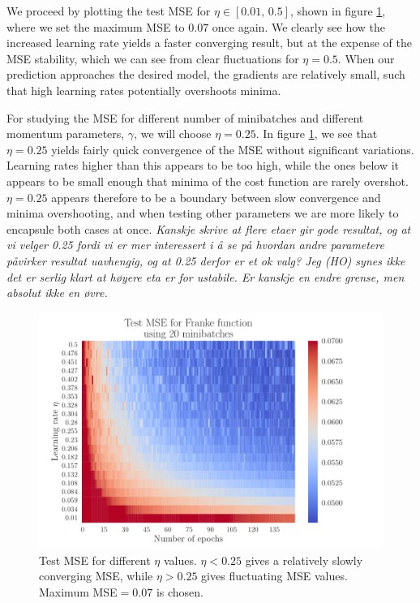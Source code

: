 \documentclass[12pt]{extarticle}
\begin{document}
We proceed by plotting the test MSE for $\eta\in[0.01,\,0.5]$, shown in figure \ref{fig:SGD_Franke_epochs_eta}, where we set the maximum MSE to $0.07$ once again. We clearly see how the increased learning rate yields a faster converging result, but at the expense of the MSE stability, which we can see from clear fluctuations for $\eta=0.5$. When our prediction approaches the desired model, the gradients are relatively small, such that high learning rates potentially overshoots minima.

For studying the MSE for different number of minibatches and different momentum parameters, $\gamma$, we will choose $\eta=0.25$. In figure \ref{fig:SGD_Franke_epochs_eta}, we see that $\eta=0.25$ yields fairly quick convergence of the MSE without significant variations. Learning rates higher than this appears to be too high, while the ones below it appears to be small enough that minima of the cost function are rarely overshot. $\eta=0.25$ appears therefore to be a boundary between slow convergence and minima overshooting, and when testing other parameters we are more likely to encapsule both cases at once.
\textit{Kanskje skrive at flere etaer gir gode resultat, og at vi velger 0.25 fordi vi er mer interessert i å se på hvordan andre parametere påvirker resultat uavhengig, og at 0.25 derfor er et ok valg? Jeg (HO) synes ikke det er serlig klart at høyere eta er for ustabile. Er kanskje en endre grense, men absolut ikke en øvre.}

\begin{figure}[h!]
	\includegraphics[width=0.9\linewidth]{SGD_Franke/reg_Franke__epochs_eta__Test_MSE__262224.pdf}
	\caption{Test MSE for different $\eta$ values. $\eta<0.25$ gives a relatively slowly converging MSE, while $\eta>0.25$ gives fluctuating MSE values. Maximum MSE$=0.07$ is chosen.}
	\label{fig:SGD_Franke_epochs_eta}
\end{figure}
\end{document}
